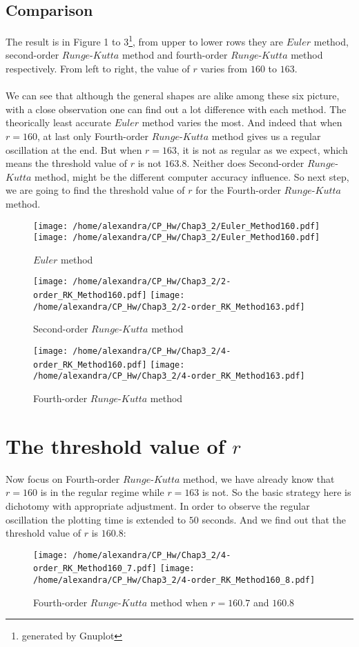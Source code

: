 \documentclass{article}
\begin{document}
\subsection{Comparison}
\quad The result is in Figure 1 to 3\footnote{generated by Gnuplot}, from upper to lower rows they are $Euler$ method, second-order $Runge$-$Kutta$ method and fourth-order $Runge$-$Kutta$ method respectively. From left to right, the value of $r$ varies from $160$ to $163$.\\\\
\quad We can see that although the general shapes are alike among these six picture, with a close observation one can find out a lot difference with each method. The theorically least accurate $Euler$ method varies the most. And indeed that when $r=160$, at last only Fourth-order $Runge$-$Kutta$ method gives us a regular oscillation at the end. But when $r=163$, it is not as regular as we expect, which means the threshold value of $r$ is not $163.8$. Neither does Second-order $Runge$-$Kutta$ method, might be the different computer accuracy influence. So next step, we are going to find the threshold value of $r$ for the Fourth-order $Runge$-$Kutta$ method.
\begin{figure}[htbp]
\centering
\texttt{[image: /home/alexandra/CP\_Hw/Chap3\_2/Euler\_Method160.pdf]}
\texttt{[image: /home/alexandra/CP\_Hw/Chap3\_2/Euler\_Method160.pdf]}
\caption{$Euler$ method}
\end{figure}


\begin{figure}[htbp]
\centering
\texttt{[image: /home/alexandra/CP\_Hw/Chap3\_2/2-order\_RK\_Method160.pdf]}
\texttt{[image: /home/alexandra/CP\_Hw/Chap3\_2/2-order\_RK\_Method163.pdf]}
\caption{Second-order $Runge$-$Kutta$ method}
\end{figure}

\begin{figure}[htbp]
\centering
\texttt{[image: /home/alexandra/CP\_Hw/Chap3\_2/4-order\_RK\_Method160.pdf]}
\texttt{[image: /home/alexandra/CP\_Hw/Chap3\_2/4-order\_RK\_Method163.pdf]}
\caption{Fourth-order $Runge$-$Kutta$ method}
\end{figure}
\newpage
\section{The threshold value of $r$}
\quad Now focus on Fourth-order $Runge$-$Kutta$ method, we have already know that $r=160$ is in the regular regime while $r=163$ is not. So the basic strategy here is dichotomy with appropriate adjustment. In order to observe the regular oscillation the plotting time is extended to $50$ seconds. And we find out that the threshold value of $r$ is $160.8$:\\
\begin{figure}[htbp]
\centering
\texttt{[image: /home/alexandra/CP\_Hw/Chap3\_2/4-order\_RK\_Method160\_7.pdf]}
\texttt{[image: /home/alexandra/CP\_Hw/Chap3\_2/4-order\_RK\_Method160\_8.pdf]}
\caption{Fourth-order $Runge$-$Kutta$ method when $r=160.7$ and $160.8$}
\end{figure}
\newpage
\end{document}
